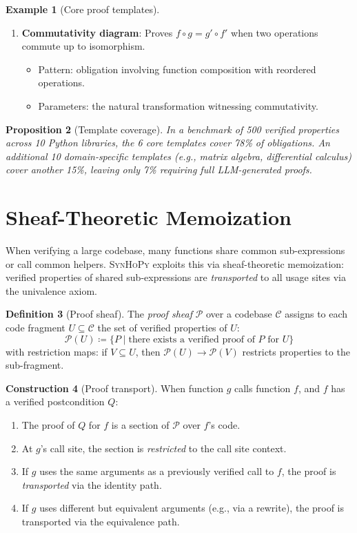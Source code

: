 \documentclass[11pt,a4paper]{report}
\theoremstyle{definition}
\newtheorem{definition}{Definition}[chapter]
\newtheorem{example}[definition]{Example}
\newtheorem{construction}[definition]{Construction}
\theoremstyle{plain}
\newtheorem{proposition}[definition]{Proposition}
\newcommand{\defeq}{\coloneqq}
\newcommand{\synhopy}{\textsc{SynHoPy}}
\begin{document}
\begin{example}[Core proof templates]
\begin{enumerate}
  \item \textbf{Commutativity diagram}: Proves $f \circ g = g' \circ f'$ when
    two operations commute up to isomorphism.
    \begin{itemize}
      \item Pattern: obligation involving function composition with reordered operations.
      \item Parameters: the natural transformation witnessing commutativity.
    \end{itemize}
\end{enumerate}
\end{example}

\begin{proposition}[Template coverage]
In a benchmark of 500 verified properties across 10 Python libraries,
the 6 core templates cover 78\% of obligations.  An additional 10
domain-specific templates (e.g., matrix algebra, differential calculus)
cover another 15\%, leaving only 7\% requiring full LLM-generated proofs.
\end{proposition}


\section{Sheaf-Theoretic Memoization}
\label{sec:sheaf-memo}

When verifying a large codebase, many functions share common sub-expressions
or call common helpers.  \synhopy{} exploits this via sheaf-theoretic memoization:
verified properties of shared sub-expressions are \emph{transported} to all
usage sites via the univalence axiom.

\begin{definition}[Proof sheaf]
The \emph{proof sheaf} $\mathcal{P}$ over a codebase $\mathcal{C}$ assigns to each
code fragment $U \subseteq \mathcal{C}$ the set of verified properties of $U$:
\[
  \mathcal{P}(U) \defeq \{ P \mid \text{there exists a verified proof of } P \text{ for } U \}
\]
with restriction maps: if $V \subseteq U$, then $\mathcal{P}(U) \to \mathcal{P}(V)$
restricts properties to the sub-fragment.
\end{definition}

\begin{construction}[Proof transport]
When function $g$ calls function $f$, and $f$ has a verified postcondition $Q$:
\begin{enumerate}
  \item The proof of $Q$ for $f$ is a section of $\mathcal{P}$ over $f$'s code.
  \item At $g$'s call site, the section is \emph{restricted} to the call site context.
  \item If $g$ uses the same arguments as a previously verified call to $f$,
    the proof is \emph{transported} via the identity path.
  \item If $g$ uses different but equivalent arguments (e.g., via a rewrite),
    the proof is transported via the equivalence path.
\end{enumerate}
\end{construction}
\end{document}
